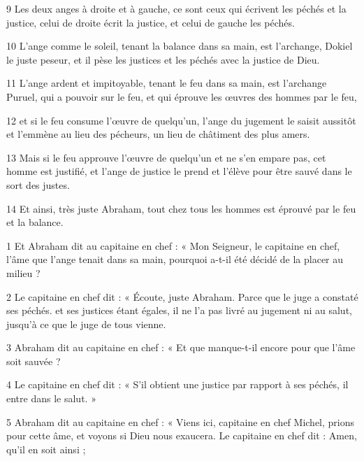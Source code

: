 \par 9 Les deux anges à droite et à gauche, ce sont ceux qui écrivent les péchés et la justice, celui de droite écrit la justice, et celui de gauche les péchés.

\par 10 L'ange comme le soleil, tenant la balance dans sa main, est l'archange, Dokiel le juste peseur, et il pèse les justices et les péchés avec la justice de Dieu.

\par 11 L'ange ardent et impitoyable, tenant le feu dans sa main, est l'archange Puruel, qui a pouvoir sur le feu, et qui éprouve les œuvres des hommes par le feu,

\par 12 et si le feu consume l'œuvre de quelqu'un, l'ange du jugement le saisit aussitôt et l'emmène au lieu des pécheurs, un lieu de châtiment des plus amers.

\par 13 Mais si le feu approuve l'œuvre de quelqu'un et ne s'en empare pas, cet homme est justifié, et l'ange de justice le prend et l'élève pour être sauvé dans le sort des justes.

\par 14 Et ainsi, très juste Abraham, tout chez tous les hommes est éprouvé par le feu et la balance.


\par 1 Et Abraham dit au capitaine en chef : « Mon Seigneur, le capitaine en chef, l'âme que l'ange tenait dans sa main, pourquoi a-t-il été décidé de la placer au milieu ?

\par 2 Le capitaine en chef dit : « Écoute, juste Abraham. Parce que le juge a constaté ses péchés. et ses justices étant égales, il ne l'a pas livré au jugement ni au salut, jusqu'à ce que le juge de tous vienne.

\par 3 Abraham dit au capitaine en chef : « Et que manque-t-il encore pour que l'âme soit sauvée ?

\par 4 Le capitaine en chef dit : « S'il obtient une justice par rapport à ses péchés, il entre dans le salut. »

\par 5 Abraham dit au capitaine en chef : « Viens ici, capitaine en chef Michel, prions pour cette âme, et voyons si Dieu nous exaucera. Le capitaine en chef dit : Amen, qu'il en soit ainsi ;

